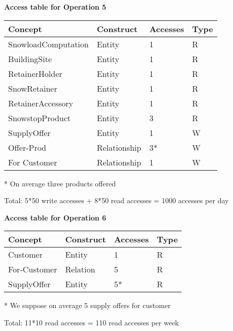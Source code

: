 {\vspace{12px}

{\centering \textbf{Access table for Operation 5}\\}
\begin{table}[H]
  \def\arraystretch{1.10}%
  \centering
  \begin{tabular}{ | m{4cm} | m{4cm}| m{3cm} | m{2cm} |}
    \hline
    {\textbf{\large Concept}} & {\textbf{\large Construct}} & {\textbf{\large Accesses}} & {\textbf{\large Type}} \\
    \hline
    \color[HTML]{3531FF} SnowloadComputation & Entity & 1 & R \\
    \hline
    \color[HTML]{3531FF} BuildingSite & Entity & 1 & R \\
    \hline
    \color[HTML]{3531FF} RetainerHolder & Entity & 1 & R \\
    \hline
    \color[HTML]{3531FF} SnowRetainer & Entity & 1 & R \\
    \hline
    \color[HTML]{3531FF} RetainerAccessory & Entity & 1 & R \\
    \hline
    \color[HTML]{3531FF} SnowstopProduct & Entity & 3 & R \\
    \hline
    \color[HTML]{3531FF} SupplyOffer & Entity & 1 & W \\
    \hline
    \color[HTML]{3531FF} Offer-Prod & Relationship & 3* & W \\
    \hline
    \color[HTML]{3531FF} For Customer & Relationship & 1 & W \\
    \hline
  \end{tabular}
  \small{* On average three products offered}
\end{table}
Total: 5*50 write accesses + 8*50 read accesses = 1000 accesses per day

\vspace{12px}

{\centering \textbf{Access table for Operation 6}\\}
\begin{table}[H]
  \def\arraystretch{1.10}%
  \centering
  \begin{tabular}{ | m{4cm} | m{4cm}| m{3cm} | m{2cm} |}
    \hline
    {\textbf{\large Concept}} & {\textbf{\large Construct}} & {\textbf{\large Accesses}} & {\textbf{\large Type}} \\
    \hline
    \color[HTML]{3531FF} Customer & Entity & 1 & R \\
    \hline
    \color[HTML]{3531FF} For-Customer & Relation & 5 & R \\
    \hline
    \color[HTML]{3531FF} SupplyOffer & Entity & 5* & R \\
    \hline
  \end{tabular}
  \small{* We suppose on average 5 supply offers for customer}
\end{table}
Total: 11*10 read accesses = 110 read accesses per week

}
